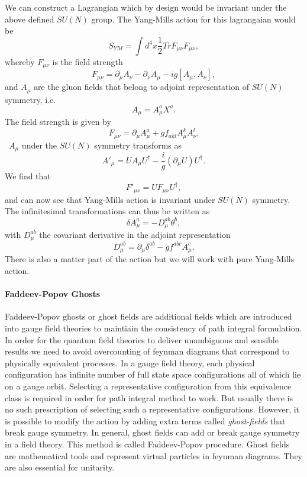 We can construct a Lagrangian which by design would be invariant under the above defined $SU(N)$ group. The Yang-Mills action for this lagrangaian would be $$S_{YM}=\int d^{4}x \frac{1}{2} Tr F_{\mu\nu}F_{\mu\nu},$$ whereby $F_{\mu\nu}$ is the field strength $$ F_{\mu\nu}=\partial_{\mu}A_{\nu}-\partial_{\nu}A_{\mu}-ig[A_{\mu},A_{\nu}],$$ and $A_{\mu}$ are the gluon fields that belong to adjoint representation of $SU(N)$ symmetry, i.e. $$A_{\mu}=A^{a}_{\mu}X^{a}.$$ The field strength is given by $$F_{\mu\nu}=\partial_{\mu}A^{a}_{\mu}+gf_{akl}A^{k}_{\mu}A^{l}_{\nu}.$$ \ $A_{\mu}$ under the $SU(N)$ symmetry transforms as $$ A'_{\mu}=UA_{\mu}U^{\dagger}-\frac{i}{g}(\partial_{\mu}U)U^{\dagger}.$$ We find that $$F'_{\mu\nu}=U F_{\mu\nu}U^{\dagger},$$ and can now see that Yang-Mills action is invariant under $SU(N)$ symmetry. The infinitesimal transformations can thus be written as $$\delta A^{a}_{\mu}=-D^{ab}_{\mu}\theta^{b},$$ with $D^{ab}_{\mu}$ the covariant derivative in the adjoint representation $$ D^{ab}_{\mu}=\partial_{\mu}\delta^{ab}-g f^{abc}A^{c}_{\mu}.$$ There is also a matter part of the action but we will work with pure Yang-Mills action.

\paragraph{Faddeev-Popov Ghosts}
Faddeev-Popov ghosts or ghost fields are additional fields which are introduced into gauge field theories to maintiain the consistency of path integral formulation. In order for the quantum field theories to deliver unambiguous and sensible results we need to avoid overcounting of feynman diagrams that correspond to physically equivalent processes. In a gauge field theory, each physical configuration has infinite number of full state space configurations all of which lie on a gauge orbit. Selecting a representative configuration from this equivalence class is required in order for path integral method to work. But usually there is no such prescription of selecting such a representative configurations. However, it is possible to modify the action by adding extra terms called \emph{ghost-fields} that break gauge symmetry. In general, ghost fields can add or break gauge symmetry in a field theory. This method is called Faddeev-Popov procedure. Ghost fields are mathematical tools and represent virtual particles in feynman diagrams. They are also essential for unitarity.

